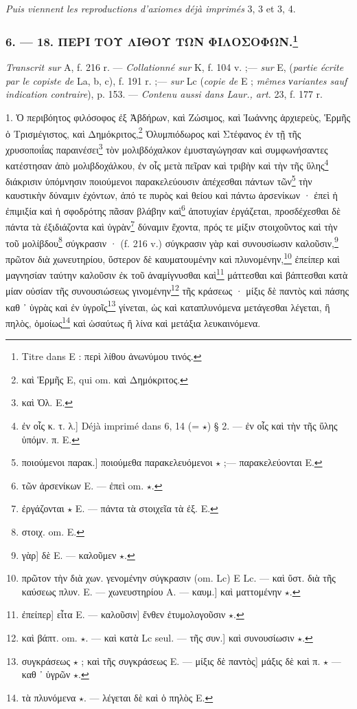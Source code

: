 \documentclass[a4paper, 11pt, oneside, polutonikogreek, french]{article}
\begin{document}
\emph{Puis viennent les reproductions d'axiomes déjà imprimés} 3, 3 et 3, 4.

\bigskip
\centerline{\EightStarTaper}
\centerline{\EightStarTaper\EightStarTaper}
\bigskip

\subsubsection[6. --- 18. ΠΕΡΙ ΤΟΥ ΛΙΘΟΥ ΤΩΝ ΦΙΛΟΣΟΦΩΝ.]{6. --- 18. ΠΕΡΙ ΤΟΥ ΛΙΘΟΥ ΤΩΝ ΦΙΛΟΣΟΦΩΝ.\footnote{Titre dans E : περὶ λίθου ἀνωνύμου τινός.}}

\emph{Transcrit sur} A, f. 216 r. --- \emph{Collationné sur} K, f. 104 v. ;--- \emph{sur} E, (\emph{partie écrite par le copiste de} La, b, c), f. 191 r. ;--- \emph{sur} Lc (\emph{copie de} E ; \emph{mêmes νariantes sauf indication contraire}), p. 153. --- \emph{Contenu aussi dans Laur., art.} 23, f. 177 r.

1. Ὁ περιβόητος φιλόσοφος ἐξ Ἀβδήρων, καὶ Ζώσιμος, καὶ Ἰωάννης ἀρχιερεὺς, Ἑρμῆς ὁ Τρισμέγιστος, καὶ Δημόκριτος,\footnote{καὶ Ἑρμῆς E, qui om. καὶ Δημόκριτος.} Ὀλυμπιόδωρος καὶ Στέφανος ἐν τῇ τῆς χρυσοποιΐας παραινέσει\footnote{καὶ Ὀλ. E.} τὸν μολιβδόχαλκον ἐμυσταγώγησαν καὶ συμφωνήσαντες κατέστησαν ἀπὸ μολιβδοχάλκου, ἐν οἷς μετὰ πεῖραν καὶ τριβὴν καὶ τὴν τῆς ὕλης\footnote{ἐν οἷς κ. τ. λ.] Déjà imprimé dans 6, 14 (= $\star$) § 2. --- ἐν οἷς καὶ τὴν τῆς ὕλης ὑπόμν. π. E.} διάκρισιν ὑπόμνησιν ποιούμενοι παρακελεύουσιν ἀπέχεσθαι πάντων τῶν\footnote{ποιούμενοι παρακ.] ποιούμεθα παρακελευόμενοι $\star$ ;--- παρακελεύονται E.} τὴν καυστικὴν δύναμιν ἐχόντων, ἀπό τε πυρὸς καὶ θείου καὶ πάντω ἀρσενίκων · ἐπεὶ ἡ ἐπιμιξία καὶ ἡ σφοδρότης πᾶσαν βλάβην καὶ\footnote{τῶν ἀρσενίκων E. --- ἐπεὶ om. $\star$.} ἀποτυχίαν ἐργάζεται, προσδέχεσθαι δὲ πάντα τὰ ἐξιδιάζοντα καὶ ὑγρὰν\footnote{ἐργάζονται $\star$ E. --- πάντα τὰ στοιχεῖα τὰ ἐξ. E.} δύναμιν ἔχοντα, πρός τε μίξιν στοιχοῦντος καὶ τὴν τοῦ μολίβδου\footnote{στοιχ. om. E.} σύγκρασιν · (f. 216 v.) σύγκρασιν γὰρ καὶ συνουσίωσιν καλοῦσιν,\footnote{γὰρ] δὲ E. --- καλοῦμεν $\star$.} πρῶτον διὰ χωνευτηρίου, ὕστερον δὲ καυματουμένην καὶ πλυνομένην,\footnote{πρῶτον τὴν διὰ χων. γενομένην σύγκρασιν (om. Lc) E Lc. --- καὶ ὕστ. διὰ τῆς καύσεως πλυν. E. --- χωνευστηρίου A. --- καυμ.] καὶ ματτομένην $\star$.} ἐπείπερ καὶ μαγνησίαν ταύτην καλοῦσιν ἐκ τοῦ ἀναμίγνυσθαι καὶ\footnote{ἐπείπερ] εἶτα E. --- καλοῦσιν] ἔνθεν ἐτυμολογοῦσιν $\star$.} μάττεσθαι καὶ βάπτεσθαι κατὰ μίαν οὐσίαν τῆς συνουσιώσεως γινομένην\footnote{καὶ βάπτ. om. $\star$. --- καὶ κατὰ Lc seul. --- τῆς συν.] καὶ συνουσίωσιν $\star$.} τῆς κράσεως · μίξις δὲ παντὸς καὶ πάσης καθ ᾽ ὑγρὰς καὶ ἐν ὑγροῖς\footnote{συγκράσεως $\star$ ; καὶ τῆς συγκράσεως E. --- μίξις δὲ παντὸς] μάξις δὲ καὶ π. $\star$ --- καθ ᾽ ὑγρῶν $\star$.} γίνεται, ὡς καὶ καταπλυνόμενα μετάγεσθαι λέγεται, ἢ πηλὸς, ὁμοίως\footnote{τὰ πλυνόμενα $\star$. --- λέγεται δὲ καὶ ὁ πηλὸς E.} καὶ ὡσαύτως ἢ λίνα καὶ μετάξια λευκαινόμενα.
\end{document}
